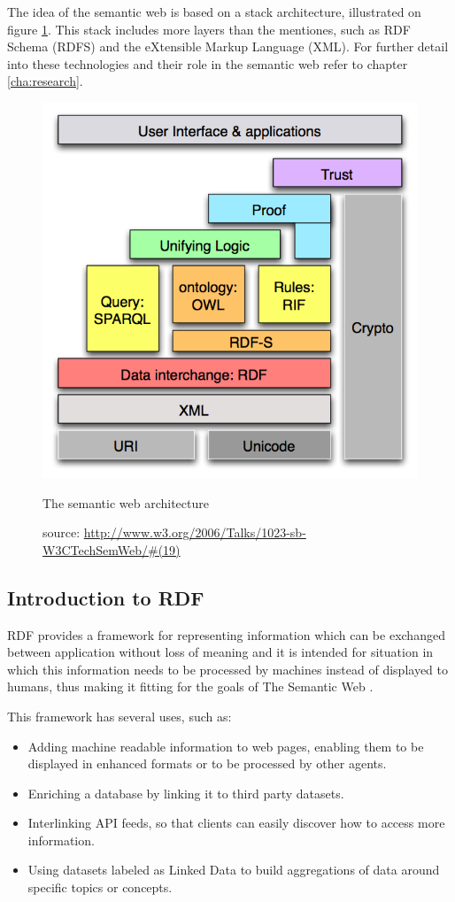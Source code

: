 The idea of the semantic web is based on a stack architecture, illustrated on figure \ref{fig:semwebstack}. This stack includes more layers than the mentiones, such as RDF Schema (RDFS) and the eXtensible Markup Language (XML). For further detail into these technologies and their role in the semantic web refer to chapter \ref{cha:research}.

\begin{figure}
  \centering
  \includegraphics[width=.5\textwidth]{fig/semwebstack}
  \caption{The semantic web architecture}
  \caption*{source: \url{http://www.w3.org/2006/Talks/1023-sb-W3CTechSemWeb/\#(19)}}
  \label{fig:semwebstack}
\end{figure} 

\subsection{Introduction to RDF}

RDF provides a framework for representing information which can be exchanged between application without loss of meaning and it is intended for situation in which this information needs to be processed by machines instead of displayed to humans, thus making it fitting for the goals of The Semantic Web  \cite{rdfprimer11}.

This framework has several uses, such as:

\begin{itemize}
	\item Adding machine readable information to web pages, enabling them to be displayed in enhanced formats or to be processed by other agents.
	\item Enriching a database by linking it to third party datasets.
	\item Interlinking API feeds, so that clients can easily discover how to access more information.
	\item Using datasets labeled as Linked Data to build aggregations of data around specific topics or concepts.
\end{itemize} 

